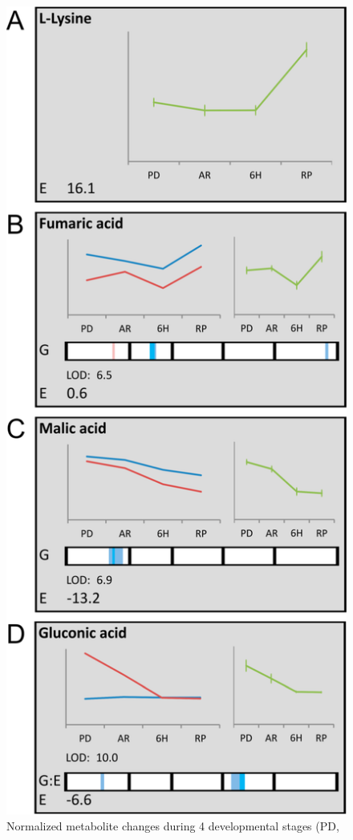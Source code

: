 \begin{figure}[h!]
  \centering
  \includegraphics[keepaspectratio,scale=0.20]{eps/image_3_2_4.eps}
  \caption[Normalized metabolite changes]{Normalized metabolite changes during 4 developmental stages (PD, 
}
\end{figure}
